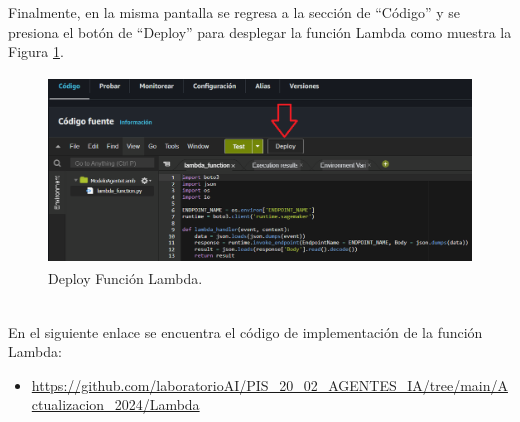 \documentclass[a4paper,10pt, oneside, titlepage]{article}
\begin{document}
	\indent Finalmente, en la misma pantalla se regresa a la sección de ``Código'' y se presiona el botón de ``Deploy'' para desplegar la función Lambda como muestra la Figura \ref{Deploy_Lambda}.
	\begin{figure}[!h]
		\centering
		\includegraphics[width = 1\linewidth, height = 5cm]{Deploy_Lambda.png}
		\caption{Deploy Función Lambda.}
		\label{Deploy_Lambda}
	\end{figure} \\
	\indent En el siguiente enlace se encuentra el código de implementación de la función Lambda:
	\begin{itemize}
		\item \textcolor{blue}{\url{https://github.com/laboratorioAI/PIS_20_02_AGENTES_IA/tree/main/Actualizacion_2024/Lambda}}
	\end{itemize}
\end{document}
